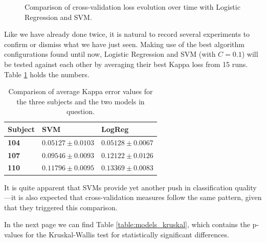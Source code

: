 \begin{figure}[bth]
\begin{center}
		\end{center}
		\caption[Cross-validation loss comparison with Logistic Regression and SVM]{Comparison of cross-validation loss evolution over time with Logistic Regression and SVM.}\label{gfx:fs_models_cv}

	\end{figure}

	Like we have already done twice, it is natural to record several experiments to confirm or dismiss what we have just seen. Making use of the best algorithm configurations found until now, Logistic Regression and \acs{SVM} (with $C = 0.1$) will be tested against each other by averaging their best Kappa loss from 15 runs. Table \ref{table:models_kappa} holds the numbers.

	\vspace{0.3cm}

	\begin{table}[h]

        \centering
        \setlength\arrayrulewidth{0.8pt}

        \begin{tabular}{| >{\centering\arraybackslash}m{0.5in} | >{\centering\arraybackslash}m{1.1in} | >{\centering\arraybackslash}m{1.1in} |}

            \hline
            \rowcolor{RoyalBlue}
            \textbf{Subject} & \textbf{SVM} & \textbf{LogReg} \\
            \hline
            \textbf{104} & $0.05127 \pm 0.0103$ & $0.05128 \pm 0.0067$ \\
            \hline
            \textbf{107} & $0.09546 \pm 0.0093$ & $0.12122 \pm 0.0126$ \\
            \hline
            \textbf{110} & $0.11796 \pm 0.0095$ & $0.13369 \pm 0.0083$ \\
            \hline

        \end{tabular}

        \caption{Comparison of average Kappa error values for the three subjects and the two models in question.}\label{table:models_kappa}

    \end{table}

    It is quite apparent that \acs{SVM}s provide yet another push in classification quality---it is also expected that cross-validation measures follow the same pattern, given that they triggered this comparison.

    In the next page we can find Table \ref{table:models_kruskal}, which contains the p-values for the Kruskal-Wallis test for statistically significant differences.

